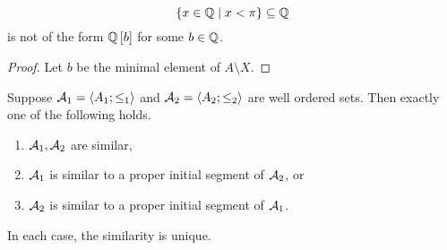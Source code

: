 \begin{example2}
$$ \cb{x \in \Q \mid x < \pi} \subseteq \Q $$
is not of the form $ \Q\sb{b} $ for some $ b \in \Q $.
\end{example2}

\begin{proof}
Let $ b $ be the minimal element of $ A \setminus X $.
\end{proof}

\begin{theorem}
\label{thm:3.3.7}
Suppose $ \AA_1 = \ab{A_1; \le_1} $ and $ \AA_2 = \ab{A_2; \le_2} $ are well ordered sets. Then exactly one of the following holds.
\begin{enumerate}
\item $ \AA_1, \AA_2 $ are similar,
\item $ \AA_1 $ is similar to a proper initial segment of $ \AA_2 $, or
\item $ \AA_2 $ is similar to a proper initial segment of $ \AA_1 $.
\end{enumerate}
In each case, the similarity is unique.
\end{theorem}

\pagebreak

